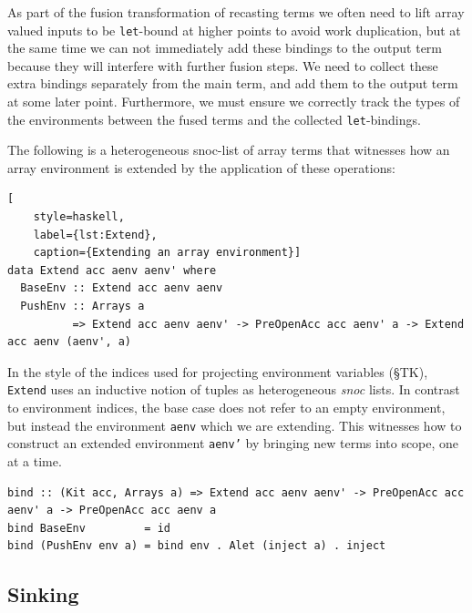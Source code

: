 As part of the fusion transformation of recasting terms we often need to lift
array valued inputs to be \texttt{let}-bound at higher points to avoid work
duplication, but at the same time we can not immediately add these bindings to
the output term because they will interfere with further fusion steps. We need
to collect these extra bindings separately from the main term, and add them
to the output term at some later point. Furthermore, we must ensure we correctly
track the types of the environments between the fused terms and the collected
\texttt{let}-bindings.

The following is a heterogeneous snoc-list of array terms that witnesses how an
array environment is extended by the application of these operations:
%
\begin{lstlisting}[
    style=haskell,
    label={lst:Extend},
    caption={Extending an array environment}]
data Extend acc aenv aenv' where
  BaseEnv :: Extend acc aenv aenv
  PushEnv :: Arrays a
          => Extend acc aenv aenv' -> PreOpenAcc acc aenv' a -> Extend acc aenv (aenv', a)
\end{lstlisting}
%
In the style of the  indices used for projecting environment
variables (\S TK), \texttt{Extend} uses an inductive notion of tuples as
heterogeneous \emph{snoc} lists. In contrast to environment indices, the base
case does not refer to an empty environment, but instead the environment
\texttt{aenv} which we are extending. This witnesses how to construct an
extended environment \texttt{aenv'} by bringing new terms into scope, one at a
time.
%
\begin{lstlisting}[style=haskell]
bind :: (Kit acc, Arrays a) => Extend acc aenv aenv' -> PreOpenAcc acc aenv' a -> PreOpenAcc acc aenv a
bind BaseEnv         = id
bind (PushEnv env a) = bind env . Alet (inject a) . inject
\end{lstlisting}


\subsection{Sinking}
\label{sec:sinking}

